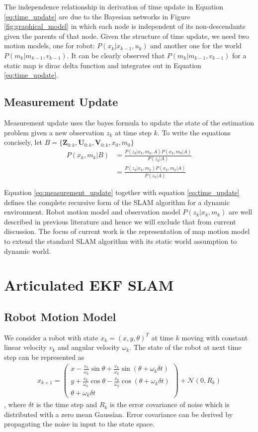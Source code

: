 \documentclass[conference]{IEEEtran}
\begin{document}
The independence relationship in derivation of time update in Equation \ref{eq:time_update} are due to the Bayesian networks in Figure \ref{fig:graphical_model} in which each node is independent of its non-descendants given the parents of that node. Given the structure of time update, we need two motion models, one for robot: $P(x_k|x_{k-1},u_k)$ and another one for the world $P(m_k|m_{k-1},v_{k-1})$. It can be clearly observed that $P(m_k|m_{k-1},v_{k-1})$ for a static map is dirac delta function and integrates out in Equation \ref{eq:time_update}. 

\subsection{Measurement Update} Measurement update uses the bayes formula to update the state of the estimation problem given a new observation $z_k$ at time step $k$. To write the equations concisely, let $B =\{ \mathbf{Z}_{0:k},\mathbf{U}_{0:k},\mathbf{V}_{0:k},x_0,m_0 \}$
 \begin{align}
P(x_k,m_k|B) &= \frac{P(z_k|x_k,m_k,A)P(x_k,m_k|A)}{P(z_k|A)} \nonumber\\
&=\frac{P(z_k|x_k,m_k)P(x_k,m_k|A)}{P(z_k|A)}
\label{eq:measurement_update}
\end{align}

Equation \ref{eq:measurement_update} together with equation \ref{eq:time_update} defines the complete recursive form of the SLAM algorithm for a dynamic environment. Robot motion model and observation model $P(z_k|x_k,m_k)$ are well described in previous literature and hence we will exclude that from current discussion. The focus of current work is the representation of map motion model to extend the standard SLAM algorithm with its static world assumption to dynamic world.

\section{Articulated EKF SLAM}

\subsection{Robot Motion Model} We consider a robot with state $x_k = (x,y,\theta)^T$ at time $k$ moving with constant linear velocity $v_k$ and angular velocity $\omega_k$. The state of the robot at next time step can be represented as 
\begin{align}
x_{k+1} = 
\begin{pmatrix}
x-\frac{v_k}{\omega_k} \sin{\theta} + \frac{v_k}{\omega_k}\sin(\theta+\omega_k \delta t) \\
y+\frac{v_k}{\omega_k} \cos{\theta} - \frac{v_k}{\omega_k}\cos(\theta+\omega_k \delta t) \\
\theta+\omega_k \delta t
\end{pmatrix}+ \mathcal{N}(0,R_k) \label{eq:robot_model}
\end{align},
where $\delta t$ is the time step and $R_k$ is the error covariance of noise which is distributed with a zero mean Gaussian. Error covariance can be derived by propagating the noise in input to the state space\cite{thrun2005probabilistic}.
\end{document}
